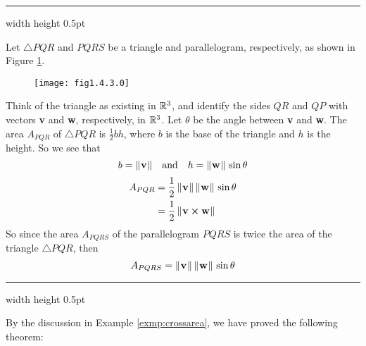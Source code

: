 \vspace{4mm}
\hrule width \textwidth height 0.5pt
\begin{exmp}\label{exmp:crossarea}
 Let $\triangle PQR$ and $PQRS$ be a triangle and parallelogram, respectively, as shown in Figure \ref{fig:crossarea}.

 \begin{figure}[h]
 \begin{center}
  \texttt{[image: fig1.4.3.0]}\vspace{-5mm}
 \end{center}
 \caption[]{}
 \label{fig:crossarea}
\end{figure}

 Think of the triangle as existing in $\mathbb{R}^{3}$, and identify the sides $QR$ and $QP$ with vectors \textbf{v} and
 \textbf{w}, respectively, in $\mathbb{R}^{3}$. Let $\theta$ be the angle between \textbf{v} and \textbf{w}. The area
 $A_{PQR}$ of $\triangle PQR$ is $\frac{1}{2} b h$, where $b$ is the base of the triangle and $h$ is the height. So
 we see that
 \begin{displaymath}
  b = \lVert\mspace{1mu}\textbf{v}\mspace{1mu}\rVert \quad \text{and} \quad h = \lVert\mspace{1mu}\textbf{w}\mspace{1mu}\rVert\,\sin \theta
 \end{displaymath}
 \begin{align*}
  A_{PQR} &= \frac{1}{2}\,\lVert\mspace{1mu}\textbf{v}\mspace{1mu}\rVert\,\lVert\mspace{1mu}\textbf{w}\mspace{1mu}\rVert\,\sin \theta\\
  &= \frac{1}{2}\,\lVert\mspace{1mu}\textbf{v} \bm{\times} \textbf{w}\mspace{1mu}\rVert
 \end{align*}
 So since the area $A_{PQRS}$ of the parallelogram $PQRS$ is twice the area of the triangle $\triangle PQR$, then
 \begin{displaymath}
  A_{PQRS} = \lVert\mspace{1mu}\textbf{v}\mspace{1mu}\rVert\,\lVert\mspace{1mu}\textbf{w}\mspace{1mu}\rVert\,\sin \theta
 \end{displaymath}
\end{exmp}
\hrule width \textwidth height 0.5pt
\vspace{4mm}

By the discussion in Example \ref{exmp:crossarea}, we have proved the following theorem:

